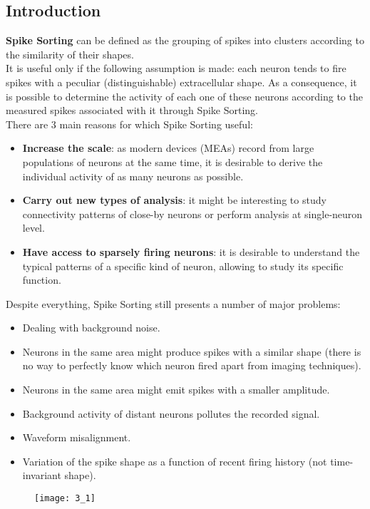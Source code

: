 \subsection{Introduction}
\textbf{Spike Sorting} can be defined as the grouping of spikes into clusters according to the similarity of their shapes.\\
It is useful only if the following assumption is made: each neuron tends to fire spikes with a peculiar (distinguishable) extracellular shape.
As a consequence, it is possible to determine the activity of each one of these neurons according to the measured spikes associated with it through Spike Sorting.\\
There are 3 main reasons for which Spike Sorting useful:
\begin{itemize}
    \item \textbf{Increase the scale}: as modern devices (MEAs) record from large populations of neurons at the same time, it is desirable to derive the individual activity of as many neurons as possible.
    \item \textbf{Carry out new types of analysis}: it might be interesting to study connectivity patterns of close-by neurons or perform analysis at single-neuron level.
    \item \textbf{Have access to sparsely firing neurons}: it is desirable to understand the typical patterns of a specific kind of neuron, allowing to study its specific function.
\end{itemize}
Despite everything, Spike Sorting still presents a number of major problems:
\begin{itemize}
    \item Dealing with background noise.
    \item Neurons in the same area might produce spikes with a similar shape (there is no way to perfectly know which neuron fired apart from imaging techniques).
    \item Neurons in the same area might emit spikes with a smaller amplitude.
    \item Background activity of distant neurons pollutes the recorded signal.
    \item Waveform misalignment.
    \item Variation of the spike shape as a function of recent firing history (not time-invariant shape).
\end{itemize}
\begin{figure}[H]
    \texttt{[image: 3\_1]}
    \centering
\end{figure}

